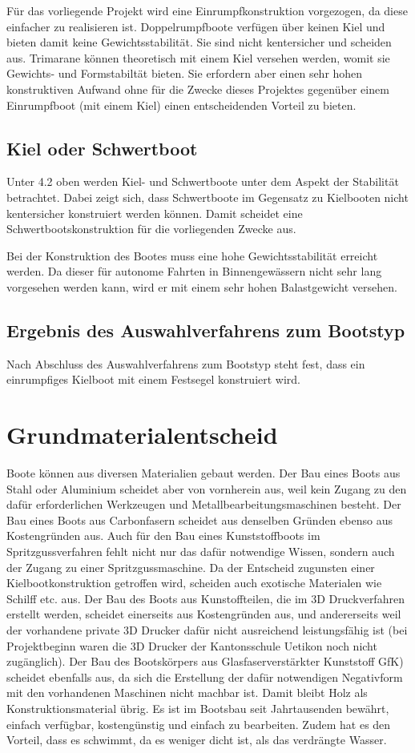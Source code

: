 Für das vorliegende Projekt wird eine Einrumpfkonstruktion vorgezogen, da diese einfacher zu realisieren ist. Doppelrumpfboote verfügen über keinen Kiel und bieten damit keine Gewichtsstabilität. Sie sind nicht kentersicher und scheiden aus. Trimarane können theoretisch mit einem Kiel versehen werden, womit sie Gewichts- und Formstabiltät bieten. Sie erfordern aber einen sehr hohen konstruktiven Aufwand ohne für die Zwecke dieses Projektes gegenüber einem Einrumpfboot (mit einem Kiel) einen entscheidenden Vorteil zu bieten. 
\subsection{Kiel oder Schwertboot}
Unter 4.2 oben werden Kiel- und Schwertboote unter dem Aspekt der Stabilität betrachtet. Dabei zeigt sich, dass Schwertboote im Gegensatz zu Kielbooten nicht kentersicher konstruiert werden können. Damit scheidet eine Schwertbootskonstruktion für die vorliegenden Zwecke aus.

Bei der Konstruktion des Bootes muss eine hohe Gewichtsstabilität erreicht werden. Da dieser für autonome Fahrten in Binnengewässern nicht sehr lang vorgesehen werden kann, wird er mit einem sehr hohen Balastgewicht versehen.  
\subsection{Ergebnis des Auswahlverfahrens zum Bootstyp}
Nach Abschluss des Auswahlverfahrens zum Bootstyp steht fest, dass ein einrumpfiges Kielboot mit einem Festsegel konstruiert wird.  
\section{Grundmaterialentscheid }
Boote können aus diversen Materialien gebaut werden. Der Bau eines Boots aus Stahl oder Aluminium scheidet aber von vornherein aus, weil kein Zugang zu den dafür erforderlichen Werkzeugen und Metallbearbeitungsmaschinen besteht. Der Bau eines Boots aus Carbonfasern scheidet aus denselben Gründen ebenso aus Kostengründen aus. Auch für den Bau eines Kunststoffboots im Spritzgussverfahren fehlt nicht nur das dafür notwendige Wissen, sondern auch der Zugang zu einer Spritzgussmaschine. Da der Entscheid zugunsten einer Kielbootkonstruktion getroffen wird, scheiden auch exotische Materialen wie Schilff etc. aus. Der Bau des Boots aus Kunstoffteilen, die im 3D Druckverfahren erstellt werden, scheidet einerseits aus Kostengründen aus, und andererseits weil der vorhandene private 3D Drucker dafür nicht ausreichend leistungsfähig ist (bei Projektbeginn waren die 3D Drucker der Kantonsschule Uetikon noch nicht zugänglich). Der Bau des Bootskörpers aus Glasfaserverstärkter Kunststoff GfK) scheidet ebenfalls aus, da sich die Erstellung der dafür notwendigen Negativform mit den vorhandenen Maschinen nicht machbar ist. Damit bleibt Holz als Konstruktionsmaterial übrig. Es ist im Bootsbau seit Jahrtausenden bewährt, einfach verfügbar, kostengünstig und einfach zu bearbeiten. Zudem hat es den Vorteil, dass es schwimmt, da es weniger dicht ist, als das verdrängte Wasser.  

